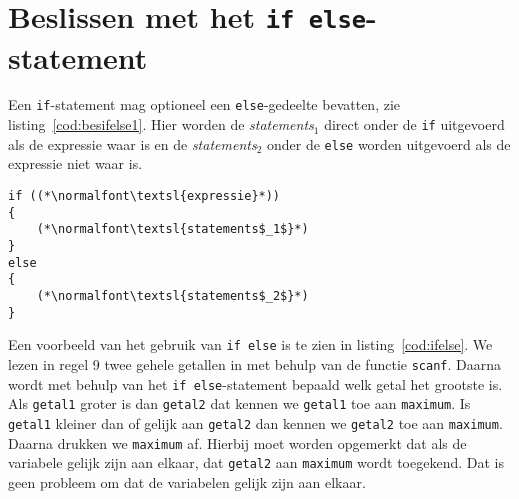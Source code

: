 \section{Beslissen met het \texttt{if else}-statement}
Een \texttt{if}-statement mag optioneel een \texttt{else}-gedeelte bevatten, zie listing~\ref{cod:besifelse1}. Hier worden de \textsl{statements}$_1$ direct onder de \texttt{if} uitgevoerd als de expressie waar is en de \textsl{statements}$_2$ onder de \texttt{else} worden uitgevoerd als de expressie niet waar is.

\begin{lstlisting}[caption=Algemene opzet van het \texttt{if else}-statement.,label=cod:besifelse1]
if ((*\normalfont\textsl{expressie}*))
{
    (*\normalfont\textsl{statements$_1$}*)
}
else
{
    (*\normalfont\textsl{statements$_2$}*)
}
\end{lstlisting}

Een voorbeeld van het gebruik van \texttt{if else} is te zien in listing~\ref{cod:ifelse}. We lezen in regel 9 twee gehele getallen in met behulp van de functie \texttt{scanf}. Daarna wordt met behulp van het \texttt{if else}-statement bepaald welk getal het grootste is. Als \texttt{getal1} groter is dan \texttt{getal2} dat kennen we \texttt{getal1} toe aan \texttt{maximum}. Is \texttt{getal1} kleiner dan of gelijk aan \texttt{getal2} dan kennen we \texttt{getal2} toe aan \texttt{maximum}. Daarna drukken we \texttt{maximum} af. Hierbij moet worden opgemerkt dat als de variabele gelijk zijn aan elkaar, dat \texttt{getal2} aan \texttt{maximum} wordt toegekend. Dat is geen probleem om dat de variabelen gelijk zijn aan elkaar.


%
%
%
%
%
%


